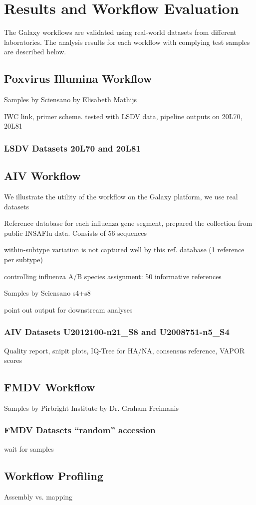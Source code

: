 \chapter{Results and Workflow Evaluation}\label{chap:results}
The Galaxy workflows are validated using real-world datasets from different laboratories. The analysis results for each workflow with complying test samples are described below.

\section{Poxvirus Illumina Workflow}
\todoit
Samples by Sciensano by Elisabeth Mathijs

\ac{IWC} link, primer scheme.
tested with \ac{LSDV} data,
pipeline outputs on 20L70, 20L81

\subsection{LSDV Datasets 20L70 and 20L81}
\todoit

\section{AIV Workflow}\label{sec:4-aiv}
\todoit

We illustrate the utility of the workflow on the Galaxy platform, we use real datasets

Reference database for each influenza gene segment, prepared the collection from public INSAFlu data. Consists of 56 sequences

within-subtype variation is not captured well by this ref. database (1 reference per subtype)

controlling influenza A/B species assignment: 50 informative references

Samples by Sciensano s4+s8

point out output for downstream analyses 

\subsection{AIV Datasets U2012100-n21\_S8 and U2008751-n5\_S4}
\todoit
Quality report, snipit plots, IQ-Tree for \ac{HA}/\ac{NA}, consensus reference, VAPOR scores

\section{FMDV Workflow}
\todoit
Samples by Pirbright Institute by Dr. Graham Freimanis

\subsection{FMDV Datasets ``random'' accession}
\todoit
wait for samples

\section{Workflow Profiling}
\todoit
Assembly vs. mapping
 